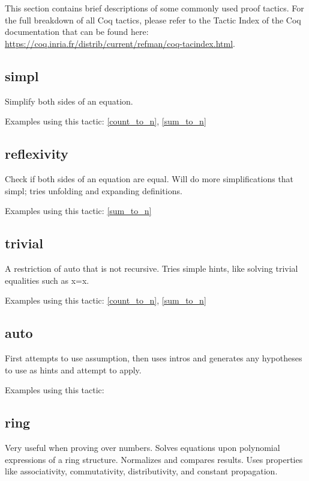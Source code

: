 
This section contains brief descriptions of some commonly used proof tactics.
For the full breakdown of all Coq tactics, please refer to the Tactic Index of the Coq documentation that can be found here:
\url{https://coq.inria.fr/distrib/current/refman/coq-tacindex.html}.


\subsection{simpl} \label{simpl}
Simplify both sides of an equation.

\noindent
Examples using this tactic: 
\ref{count_to_n},
\ref{sum_to_n}




\subsection{reflexivity} \label{reflexivity}
Check if both sides of an equation are equal. 
Will do more simplifications that simpl; tries unfolding and expanding definitions.

\noindent
Examples using this tactic: 
\ref{sum_to_n}




\subsection{trivial} \label{trivial}
A restriction of auto that is not recursive. 
Tries simple hints, like solving trivial equalities such as x=x.

\noindent
Examples using this tactic: 
\ref{count_to_n},
\ref{sum_to_n}



\subsection{auto} \label{auto}
First attempts to use assumption, then uses intros and generates any hypotheses to use as hints and attempt to apply.

\noindent
Examples using this tactic: 



\subsection{ring} \label{ring}
Very useful when proving over numbers.
Solves equations upon polynomial expressions of a ring structure. 
Normalizes and compares results.
Uses properties like associativity, commutativity, distributivity, and constant propagation.

